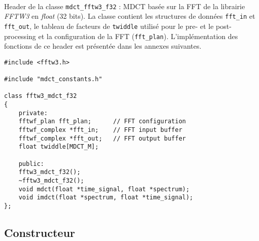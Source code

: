 \documentclass{article}
\begin{document}
\paragraph{}
Header de la classe \texttt{mdct\_fftw3\_f32} : MDCT basée sur la FFT de la librairie \emph{FFTW3} en \emph{float} (32 bits). La classe contient les structures de données \texttt{fft\_in} et \texttt{fft\_out}, le tableau de facteurs de \texttt{twiddle} utilisé pour le pre- et le post-processing et la configuration de la FFT (\texttt{fft\_plan}). L'implémentation des fonctions de ce header est présentée dans les annexes suivantes.
\lstset{language=C++}
\begin{lstlisting}
#include <fftw3.h>

#include "mdct_constants.h"

class fftw3_mdct_f32
{
    private:
    fftwf_plan fft_plan;      // FFT configuration
    fftwf_complex *fft_in;    // FFT input buffer
    fftwf_complex *fft_out;   // FFT output buffer
    float twiddle[MDCT_M];

    public:
    fftw3_mdct_f32();
    ~fftw3_mdct_f32();
    void mdct(float *time_signal, float *spectrum);
    void imdct(float *spectrum, float *time_signal);
};
\end{lstlisting}

\subsection{Constructeur}\label{app:mdct_fftw3_f32_constructor}
\end{document}
